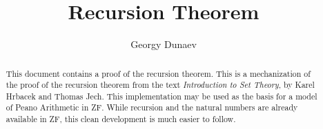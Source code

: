 \documentclass[11pt,a4paper]{article}
\begin{document}
\title{Recursion Theorem}
\author{Georgy Dunaev}
\maketitle

\begin{abstract}
  This document contains a proof of the recursion theorem.
  This is a mechanization of the proof of the recursion theorem from 
  the text \textit{Introduction to Set Theory}, by Karel Hrbacek 
  and Thomas Jech. This implementation may be used as the basis for 
  a model of Peano Arithmetic in ZF\@. While recursion and the natural
  numbers are already available in ZF, this clean development
  is much easier to follow.
\end{abstract}

\tableofcontents





\end{document}
